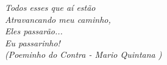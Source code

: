 \begin{epigrafe}
\vspace*{\fill}
\begin{flushright}{}



\textit{Todos esses que aí estão\\
Atravancando meu caminho,\\
Eles passarão...\\
Eu passarinho!\\
 (\small{Poeminho do Contra - Mario Quintana })}



\end{flushright}
\end{epigrafe}